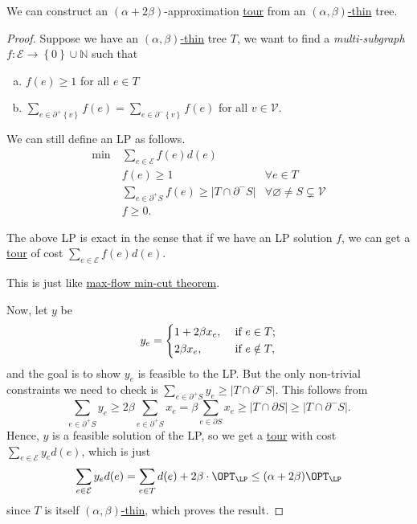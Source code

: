 \begin{lemma}\label{lma:lec11-2}
	We can construct an \((\alpha + 2\beta )\)-approximation \hyperref[def:tour]{tour} from an \hyperref[def:thin]{\((\alpha , \beta )\)-thin} tree.
\end{lemma}
\begin{proof}
	Suppose we have an \hyperref[def:thin]{\((\alpha , \beta )\)-thin} tree \(T\), we want to find a \emph{multi-subgraph} \(f\colon \mathcal{E} \to \left\{ 0 \right\} \cup \mathbb{N} \) such that
	\begin{enumerate}[(a)]
		\item \(f(e) \geq 1\) for all \(e\in T\)
		\item \(\sum_{e\in \partial ^+\left\{ v \right\} }f(e)  = \sum_{e\in \partial ^-\left\{ v \right\} } f(e)\) for all \(v\in \mathcal{V} \).
	\end{enumerate}
	We can still define an LP as follows.
	\[
		\begin{aligned}
			\min~ & \sum_{e\in \mathcal{E} }f(e) d(e)                                                                                                  \\
			      & f(e) \geq 1                                                                    & \forall e\in T                                    \\
			      & \sum_{e\in \partial ^+S} f(e) \geq \left\vert T \cap \partial ^- S \right\vert & \forall \varnothing \neq S \subsetneq \mathcal{V} \\
			      & f\geq 0.
		\end{aligned}
	\]
	\begin{claim}
		The above LP is exact in the sense that if we have an LP solution \(f\), we can get a \hyperref[def:tour]{tour} of cost \(\sum_{e\in \mathcal{E} }f(e)d(e) \).
	\end{claim}
	\begin{explanation}
		This is just like \href{https://en.wikipedia.org/wiki/Max-flow_min-cut_theorem}{max-flow min-cut theorem}.
	\end{explanation}

	Now, let \(y\) be
	\[
		y_e = \begin{dcases}
			1 + 2\beta x_e, & \text{ if } e\in T ;    \\
			2\beta x_e,     & \text{ if } e \notin T,
		\end{dcases}
	\]
	and the goal is to show \(y_e\) is feasible to the LP. But the only non-trivial constraints we need to check is \(\sum_{e\in \partial ^+ S}y_e \geq \left\vert T \cap \partial ^- S \right\vert \). This follows from
	\[
		\sum_{e\in \partial ^+ S} y_e \geq 2\beta \sum_{e\in \partial ^+ S}x_e = \beta \sum_{e\in \partial S} x_e \geq \left\vert T \cap \partial S \right\vert \geq \left\vert T \cap \partial ^- S \right\vert.
	\]
	Hence, \(y\) is a feasible solution of the LP, so we get a \hyperref[def:tour]{tour} with cost \(\sum_{e\in \mathcal{E} }y_e d(e) \), which is just
	\[
		\sum_{e\in \mathcal{E} } y_e d(e) = \sum_{e\in T} d(e) + 2\beta \cdot \OPT_{\LP } \leq (\alpha + 2\beta )\OPT_{\LP }
	\]
	since \(T\) is itself \hyperref[def:thin]{\((\alpha , \beta )\)-thin}, which proves the result.
\end{proof}

